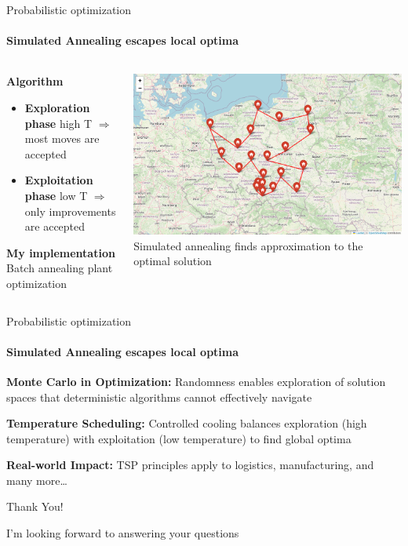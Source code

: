 \documentclass{beamer}
\begin{document}
\begin{frame}{Probabilistic optimization}
  \framesubtitle{Simulated Annealing escapes local optima}
  \begin{columns}[c]
    \begin{column}{0.4\textwidth}
      \textbf{Algorithm}
      \begin{itemize}
        \item \textbf{Exploration phase} high T $\Rightarrow$ most moves are accepted
        \item \textbf{Exploitation phase} low T $\Rightarrow$ only improvements are accepted
      \end{itemize}

      \textbf{My implementation}
      Batch annealing plant optimization
    \end{column}
    \begin{column}{0.6\textwidth}
      \begin{center}
        \includegraphics[width=\textwidth]{images/tsp-annealing.png}
        \\[0.2cm]
        \small{Simulated annealing finds approximation to the optimal solution}
      \end{center}
    \end{column}
  \end{columns}
\end{frame}

\begin{frame}{Probabilistic optimization}
  \framesubtitle{Simulated Annealing escapes local optima}

  \textbf{Monte Carlo in Optimization:} Randomness enables exploration of solution
  spaces that deterministic algorithms cannot effectively navigate

  \vspace{0.5cm}

  \textbf{Temperature Scheduling:} Controlled cooling balances exploration
  (high temperature) with exploitation (low temperature) to find global optima

  \vspace{0.5cm}

  \textbf{Real-world Impact:} TSP principles apply to logistics, manufacturing,
  and many more\ldots

  \vspace{0.5cm}
\end{frame}

\begin{frame}{Thank You!}
  \begin{center}
    \Large{I'm looking forward to answering your questions}
  \end{center}
\end{frame}
\end{document}
